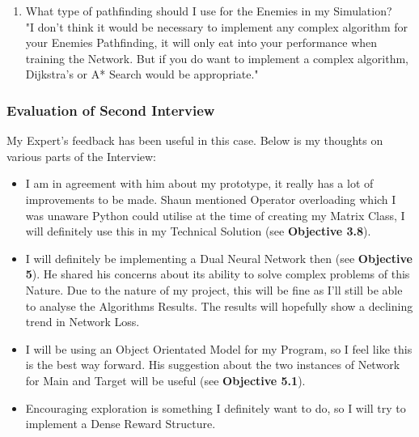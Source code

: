 \begin{flushleft}
\begin{enumerate}
                    \item What type of pathfinding should I use for the Enemies in my Simulation? \\
                        \vspace{0.2cm}
                        "I don't think it would be necessary to implement any complex algorithm for your Enemies Pathfinding, it will only eat 
                        into your performance when training the Network. But if you do want to implement a complex algorithm, Dijkstra's or A* Search 
                        would be appropriate."
                \end{enumerate}
            \subsubsection{Evaluation of Second Interview}
                My Expert's feedback has been useful in this case. Below is my thoughts on various parts of the Interview:
                
                \begin{itemize}
                    \item I am in agreement with him about my prototype, it really has a lot of improvements to be made. Shaun mentioned Operator 
                    overloading which I was unaware Python could utilise at the time of creating my Matrix Class, I will definitely use this in 
                    my Technical Solution (see \textbf{Objective 3.8}). 

                    \item I will definitely be implementing a Dual Neural Network then (see \textbf{Objective 5}). He shared his concerns about its ability to solve complex 
                    problems of this Nature. Due to the nature of my project, this will be fine as I'll still be able to analyse the Algorithms Results.
                    The results will hopefully show a declining trend in Network Loss.

                    \item I will be using an Object Orientated Model for my Program, so I feel like this is the best way forward. His suggestion 
                    about the two instances of Network for Main and Target will be useful (see \textbf{Objective 5.1}).

                    \item Encouraging exploration is something I definitely want to do, so I will try to implement a Dense Reward Structure.
                    

\end{itemize}
\end{flushleft}
